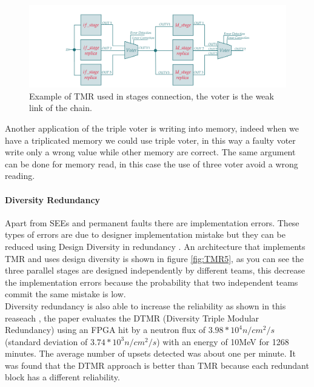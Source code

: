 {{{{{            		\begin{figure}[H]
            			\centering
            			\includegraphics[scale=0.2,center]{./images/TMR_tripleVoter3.png}
            			\caption{Example of TMR used in stages connection, the voter is the weak link of the chain.}
            			\label{fig:TMR4}
            		\end{figure} 
            		
            		Another application of the triple voter is writing into memory, indeed when we have a triplicated memory we could use triple voter, in this way a faulty voter write only a wrong value while other memory are correct. The same argument can be done for memory read, in this case the use of three voter avoid a wrong reading. 
        		}
        		\paragraph{Diversity Redundancy}{
        		    Apart from SEEs and permanent faults there are implementation errors. These types of errors are due to designer implementation mistake but they can be reduced using Design Diversity in redundancy . An architecture that implements TMR and uses design diversity is shown in figure \ref{fig:TMR5}, as you can see the three parallel stages are designed independently by different teams, this decrease the implementation errors because the probability that two independent teams commit the same mistake is low. \\
        		    
        		    
                	Diversity redundancy is also able to increase the reliability as shown in this reaseach , the paper evaluates the DTMR (Diversity Triple Modular Redundancy) using an FPGA hit by a neutron flux of $3.98*10^4 n/cm^2/s$ (standard deviation of $3.74*10^3 n/cm^2/s$) with an energy of 10MeV for 1268 minutes. 
                	The average number of upsets detected was about one per minute. It was found that the DTMR approach is better than TMR because each redundant block has a different reliability.\\
        		    
}}}}}
